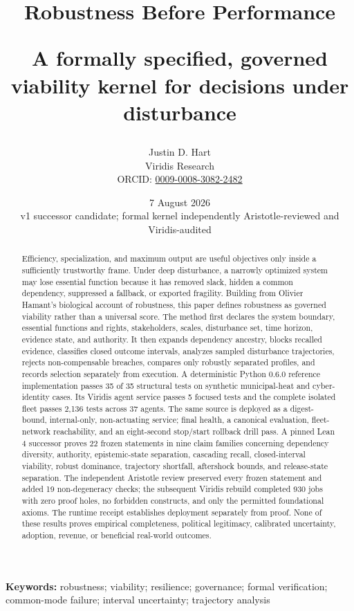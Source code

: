 \documentclass[10pt]{article}
\title{\vspace{-1.2em}\textbf{Robustness Before Performance}\par\vspace{0.3em}
{\large A formally specified, governed viability kernel for decisions under disturbance}}
\author{Justin D. Hart\\\small Viridis Research\\\small ORCID: \href{https://orcid.org/0009-0008-3082-2482}{0009-0008-3082-2482}}
\date{7 August 2026\\\small v1 successor candidate; formal kernel independently Aristotle-reviewed and Viridis-audited}
\begin{document}
\maketitle

\begin{abstract}
Efficiency, specialization, and maximum output are useful objectives only
inside a sufficiently trustworthy frame. Under deep disturbance, a narrowly
optimized system may lose essential function because it has removed slack,
hidden a common dependency, suppressed a fallback, or exported fragility.
Building from Olivier Hamant's biological account of robustness, this paper
defines robustness as governed viability rather than a universal score. The
method first declares the system boundary, essential functions and rights,
stakeholders, scales, disturbance set, time horizon, evidence state, and
authority. It then expands dependency ancestry, blocks recalled evidence,
classifies closed outcome intervals, analyzes sampled disturbance trajectories,
rejects non-compensable breaches, compares only robustly separated profiles,
and records selection separately from execution. A deterministic Python 0.6.0
reference implementation passes 35 of 35 structural tests on synthetic
municipal-heat and cyber-identity cases. Its Viridis agent service passes 5
focused tests and the complete isolated fleet passes 2,136 tests across 37
agents. The same source is deployed as a digest-bound, internal-only,
non-actuating service; final health, a canonical evaluation, fleet-network
reachability, and an eight-second stop/start rollback drill pass. A pinned Lean
4 successor proves 22 frozen statements in nine
claim families concerning dependency diversity, authority, epistemic-state
separation, cascading recall, closed-interval viability, robust dominance,
trajectory shortfall, aftershock bounds, and release-state separation. The
independent Aristotle review preserved every frozen statement and added 19
non-degeneracy checks; the subsequent Viridis rebuild completed 930 jobs with
zero proof holes, no forbidden constructs, and only the permitted foundational
axioms. The runtime receipt establishes deployment separately from proof. None
of these results proves empirical completeness, political legitimacy,
calibrated uncertainty, adoption, revenue, or beneficial real-world outcomes.
\end{abstract}

\textbf{Keywords:} robustness; viability; resilience; governance; formal
verification; common-mode failure; interval uncertainty; trajectory analysis
\end{document}
